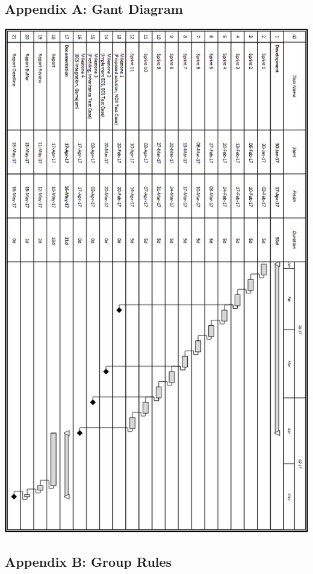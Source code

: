 \documentclass[hidelinks]{article}
\begin{document}
\subsection*{Appendix A: Gant Diagram}
\includegraphics[width=\linewidth]{gant_diagram_sideways}
\subsection*{Appendix B: Group Rules}

\end{document}
